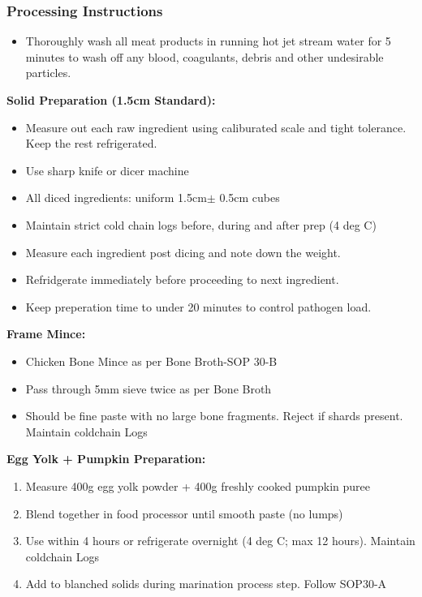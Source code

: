 \subsubsection*{Processing Instructions}
\begin{itemize}
\item Thoroughly wash all meat products in running hot jet stream water for 5 minutes to wash off any blood, coagulants, debris and other undesirable particles. 
\end{itemize}

\textbf{Solid Preparation (1.5cm Standard):}
\begin{itemize}
\item Measure out each raw ingredient using caliburated scale and tight tolerance. Keep the rest refrigerated.
\item Use sharp knife or dicer machine
\item All diced ingredients: uniform 1.5cm$\pm$ 0.5cm cubes
\item Maintain strict cold chain logs before, during and after prep (4 deg C)
\item Measure each ingredient post dicing and note down the weight. 
\item Refridgerate immediately before proceeding to next ingredient. 
\item Keep preperation time to under 20 minutes to control pathogen load. 
\end{itemize}

\textbf{Frame Mince:}
\begin{itemize}
\item Chicken Bone Mince as per Bone Broth-SOP 30-B
\item Pass through 5mm sieve twice as per Bone Broth 
\item Should be fine paste with no large bone fragments. Reject if shards present. Maintain coldchain Logs
\end{itemize}

\textbf{Egg Yolk + Pumpkin Preparation:}
\begin{enumerate}
\item Measure 400g egg yolk powder + 400g freshly cooked pumpkin puree
\item Blend together in food processor until smooth paste (no lumps)
\item Use within 4 hours or refrigerate overnight (4 deg C; max 12 hours). Maintain coldchain Logs
\item Add to blanched solids during marination process step. Follow SOP30-A
\end{enumerate}

